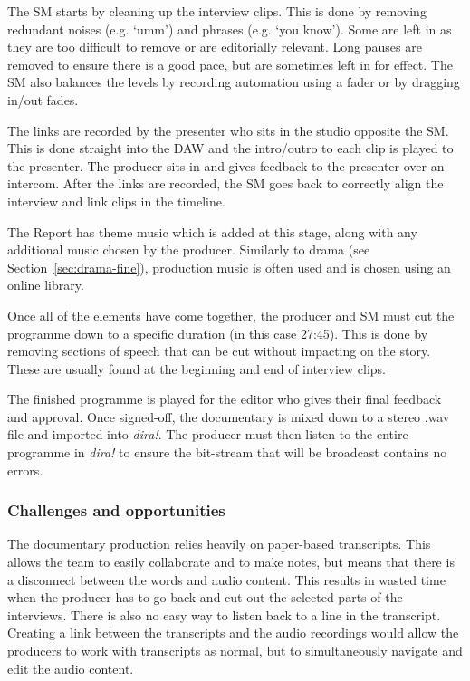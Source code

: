 The SM starts by cleaning up the interview clips. This is done by removing redundant noises (e.g. `umm') and phrases
(e.g. `you know'). Some are left in as they are too difficult to remove or are editorially relevant. Long pauses are
removed to ensure there is a good pace, but are sometimes left in for effect.  The SM also balances the levels by
recording automation using a fader or by dragging in/out fades. 

The links are recorded by the presenter who sits in the studio opposite the SM.  This is done straight into the DAW and
the intro/outro to each clip is played to the presenter. The producer sits in and gives feedback to the presenter over
an intercom. After the links are recorded, the SM goes back to correctly align the interview and link clips in the
timeline.

The Report has theme music which is added at this stage, along with any additional music chosen by the producer.
Similarly to drama (see Section~\ref{sec:drama-fine}), production music is often used and is chosen using an online
library.

Once all of the elements have come together, the producer and SM must cut the programme down to a specific duration (in
this case 27:45). This is done by removing sections of speech that can be cut without impacting on the story.  These
are usually found at the beginning and end of interview clips.

The finished programme is played for the editor who gives their final feedback and approval.  Once signed-off, the
documentary is mixed down to a stereo .wav file and imported into \textit{dira!}. The producer must then listen to the
entire programme in \textit{dira!} to ensure the bit-stream that will be broadcast contains no errors.

\subsubsection{Challenges and opportunities}
The documentary production relies heavily on paper-based transcripts. This allows the team to easily collaborate and to
make notes, but means that there is a disconnect between the words and audio content. This results in wasted time when
the producer has to go back and cut out the selected parts of the interviews. There is also no easy way to listen back
to a line in the transcript. Creating a link between the transcripts and the audio recordings would allow the producers
to work with transcripts as normal, but to simultaneously navigate and edit the audio content.

